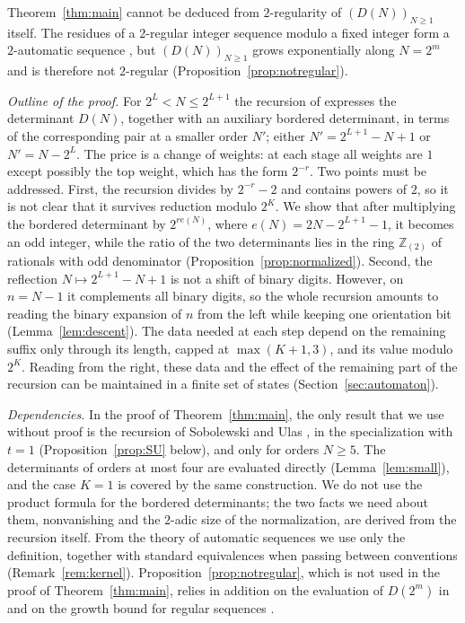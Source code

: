 \documentclass{amsart}
\theoremstyle{definition}
\theoremstyle{remark}
\numberwithin{equation}{section}
\newcommand{\Zt}{\mathbb{Z}_{(2)}}
\begin{document}
Theorem~\ref{thm:main} cannot be deduced from $2$-regularity of $(D(N))_{N\ge1}$ itself. The residues of a $2$-regular integer sequence modulo a fixed integer form a $2$-automatic sequence \cite[Corollary~2.4]{AS92}, but $(D(N))_{N\ge1}$ grows exponentially along $N=2^m$ and is therefore not $2$-regular (Proposition~\ref{prop:notregular}).

\emph{Outline of the proof.} For $2^L<N\le2^{L+1}$ the recursion of \cite{SU} expresses the determinant $D(N)$, together with an auxiliary bordered determinant, in terms of the corresponding pair at a smaller order $N'$; either $N'=2^{L+1}-N+1$ or $N'=N-2^L$. The price is a change of weights: at each stage all weights are $1$ except possibly the top weight, which has the form $2^{-r}$. Two points must be addressed. First, the recursion divides by $2^{-r}-2$ and contains powers of $2$, so it is not clear that it survives reduction modulo $2^K$. We show that after multiplying the bordered determinant by $2^{r e(N)}$, where $e(N)=2N-2^{L+1}-1$, it becomes an odd integer, while the ratio of the two determinants lies in the ring $\Zt$ of rationals with odd denominator (Proposition~\ref{prop:normalized}). Second, the reflection $N\mapsto 2^{L+1}-N+1$ is not a shift of binary digits. However, on $n=N-1$ it complements all binary digits, so the whole recursion amounts to reading the binary expansion of $n$ from the left while keeping one orientation bit (Lemma~\ref{lem:descent}). The data needed at each step depend on the remaining suffix only through its length, capped at $\max(K+1,3)$, and its value modulo $2^K$. Reading from the right, these data and the effect of the remaining part of the recursion can be maintained in a finite set of states (Section~\ref{sec:automaton}).

\emph{Dependencies.} In the proof of Theorem~\ref{thm:main}, the only result that we use without proof is the recursion of Sobolewski and Ulas \cite[Theorem~4.2]{SU}, in the specialization \cite[Proposition~4.3]{SU} with $t=1$ (Proposition~\ref{prop:SU} below), and only for orders $N\ge5$. The determinants of orders at most four are evaluated directly (Lemma~\ref{lem:small}), and the case $K=1$ is covered by the same construction. We do not use the product formula \cite[Proposition~3.7]{SU} for the bordered determinants; the two facts we need about them, nonvanishing and the $2$-adic size of the normalization, are derived from the recursion itself. From the theory of automatic sequences we use only the definition, together with standard equivalences \cite{AS} when passing between conventions (Remark~\ref{rem:kernel}). Proposition~\ref{prop:notregular}, which is not used in the proof of Theorem~\ref{thm:main}, relies in addition on the evaluation of $D(2^m)$ in \cite[Proposition~4.5]{SU} and on the growth bound for regular sequences \cite[Theorem~2.10]{AS92}.
\end{document}

